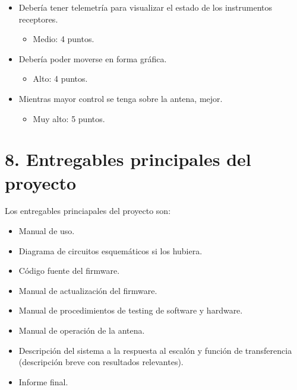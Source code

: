 \documentclass[11pt, %
codirector, %
]{charter}
\begin{document}
\begin{itemize}
	\item Debería tener telemetría para visualizar el estado de los instrumentos receptores.
		\begin{itemize}
			\item Medio: 4 puntos.
		\end{itemize}

	\item Debería poder moverse en forma gráfica. 
		\begin{itemize}
			\item Alto: 4 puntos.
		\end{itemize}
	
	\item Mientras mayor control se tenga sobre la antena, mejor. 
		\begin{itemize}
			\item Muy alto: 5 puntos.
		\end{itemize}
		

\end{itemize}

% 



\section{8. Entregables principales del proyecto}
\label{sec:entregables}



Los entregables princiapales del proyecto son:

\begin{itemize}
	\item Manual de uso. 
	\item Diagrama de circuitos esquemáticos si los hubiera. 
	\item Código fuente del firmware. 
	\item Manual de actualización del firmware.  
	\item Manual de procedimientos de testing de software y hardware.
	\item Manual de operación de la antena. 
	\item Descripción del sistema a la respuesta al escalón y función de transferencia (descripción breve con resultados relevantes).
	\item Informe final.
\end{itemize}
\end{document}

